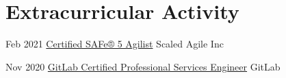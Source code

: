\documentclass[a4paper]{twentysecondcv} %
\begin{document}

\section{Extracurricular Activity}
%
\begin{twenty} %
    \twentyitem
    {Feb 2021}
    {}
    {\href{https://www.youracclaim.com/badges/deb40f91-a445-4e73-aed5-714988eefd80/}{Certified SAFe® 5 Agilist}}
    {Scaled Agile Inc}
    {}
    {}

    \twentyitem
    {Nov 2020}
    {}
    {\href{https://badgr.com/public/assertions/xTTcUSNHQ2egBleFLPkXiQ}{GitLab Certified Professional Services Engineer}}
    {GitLab}
    {}
    {}


\end{twenty}
\end{document}
